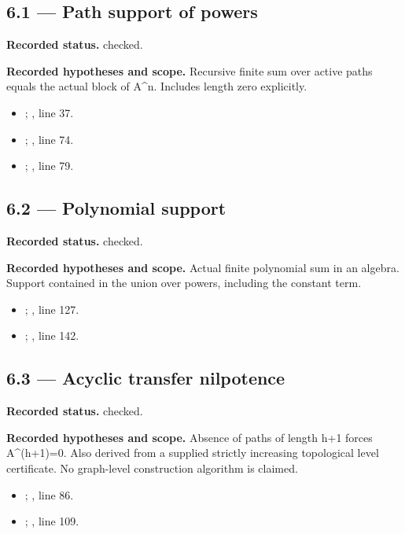 \subsection{6.1 — Path support of powers}
\label{result:6.1}
\textbf{Recorded status.} checked.

\textbf{Recorded hypotheses and scope.} Recursive finite sum over active paths equals the actual block of A\textasciicircum{}n. Includes length zero explicitly.

\begin{itemize}
\item {}; , line 37.
\item {}; , line 74.
\item {}; , line 79.
\end{itemize}
\subsection{6.2 — Polynomial support}
\label{result:6.2}
\textbf{Recorded status.} checked.

\textbf{Recorded hypotheses and scope.} Actual finite polynomial sum in an algebra. Support contained in the union over powers, including the constant term.

\begin{itemize}
\item {}; , line 127.
\item {}; , line 142.
\end{itemize}
\subsection{6.3 — Acyclic transfer nilpotence}
\label{result:6.3}
\textbf{Recorded status.} checked.

\textbf{Recorded hypotheses and scope.} Absence of paths of length h+1 forces A\textasciicircum{}(h+1)=0. Also derived from a supplied strictly increasing topological level certificate. No graph-level construction algorithm is claimed.

\begin{itemize}
\item {}; , line 86.
\item {}; , line 109.
\end{itemize}
